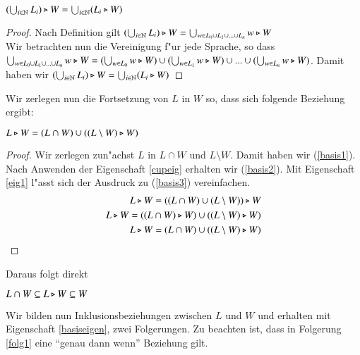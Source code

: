 \vspace{2ex}

\begin{eigen}\label{cupeig}
$(\bigcup_{i\in\mathbb{N}} L_i) \triangleright W = \bigcup_{i\in\mathbb{N}} (L_i\triangleright W)$
\end{eigen}
\begin{proof} 
Nach Definition gilt $(\bigcup_{i\in\mathbb{N}} L_i) \triangleright W = \bigcup_{w\in L_0\cup L_1\cup ... \cup L_n} w\triangleright W$\\
Wir betrachten nun die Vereinigung f"ur jede Sprache, so dass $\bigcup_{w\in L_0\cup L_1\cup ... \cup L_n} w\triangleright W = (\bigcup_{w\in L_0} w\triangleright W) \cup (\bigcup_{w\in L_1} w\triangleright W) \cup ... \cup (\bigcup_{w\in L_n} w\triangleright W)$. Damit haben wir $ (\bigcup_{i\in\mathbb{N}} L_i) \triangleright W  = \bigcup_{i\in\mathbb{N}} (L_i\triangleright W)$
\end{proof}

Wir zerlegen nun die Fortsetzung von $L$ in $W$ so, dass sich folgende Beziehung ergibt:

\vspace{2ex}

\begin{eigen}\label{basiseigen}
$L\triangleright W = (L\cap W) \cup ((L\setminus W) \triangleright W)$
\end{eigen}
\begin{proof}
Wir zerlegen zun"achst $L$ in $L\cap W$ und $L\setminus W$. Damit haben wir (\ref{basis1}). 
Nach Anwenden der Eigenschaft \ref{cupeig} erhalten wir (\ref{basis2}). Mit Eigenschaft \ref{eig1} l"asst sich der Ausdruck zu (\ref{basis3}) vereinfachen.
\begin{eqnarray}
L\triangleright W = ((L\cap W) \cup (L\setminus W)) \triangleright W \label{basis1}\\
L\triangleright W = ((L\cap W) \triangleright W) \cup ((L\setminus W) \triangleright W) \label{basis2} \\
L\triangleright W = (L\cap W) \cup ((L\setminus W) \triangleright W) \label{basis3} 
\end{eqnarray}
\end{proof}

Daraus folgt direkt

\vspace{2ex}

\begin{folg}\label{klaro}
$L\cap W \subseteq L\triangleright W \subseteq W$
\end{folg}


Wir bilden nun Inklusionsbeziehungen zwischen $L$ und $W$ und erhalten mit Eigenschaft \ref{basiseigen}, zwei Folgerungen.
Zu beachten ist, dass in Folgerung \ref{folg1} eine "`genau dann wenn"' Beziehung gilt.

